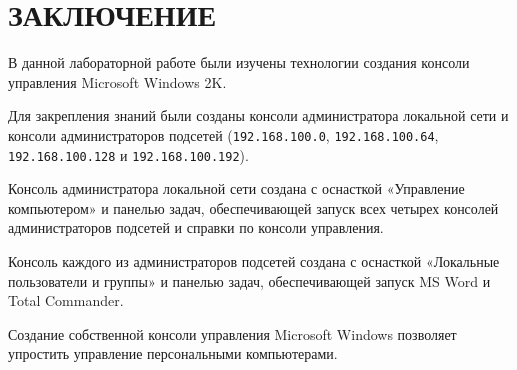 \section*{ЗАКЛЮЧЕНИЕ}

В данной лабораторной работе были изучены технологии создания
консоли управления Microsoft Windows 2K.

Для закрепления знаний были созданы консоли администратора локальной сети
и консоли администраторов подсетей (\texttt{192.168.100.0}, \texttt{192.168.100.64},
\texttt{192.168.100.128} и \texttt{192.168.100.192}).

Консоль администратора локальной сети создана с оснасткой «Управление компьютером»
и панелью задач, обеспечивающей запуск всех четырех консолей администраторов подсетей
и справки по консоли управления.

Консоль каждого из администраторов подсетей создана с оснасткой
«Локальные пользователи и группы» и панелью задач,
обеспечивающей запуск MS Word и Total Commander.

Создание собственной консоли управления Microsoft Windows
позволяет упростить управление персональными компьютерами.

\newpage